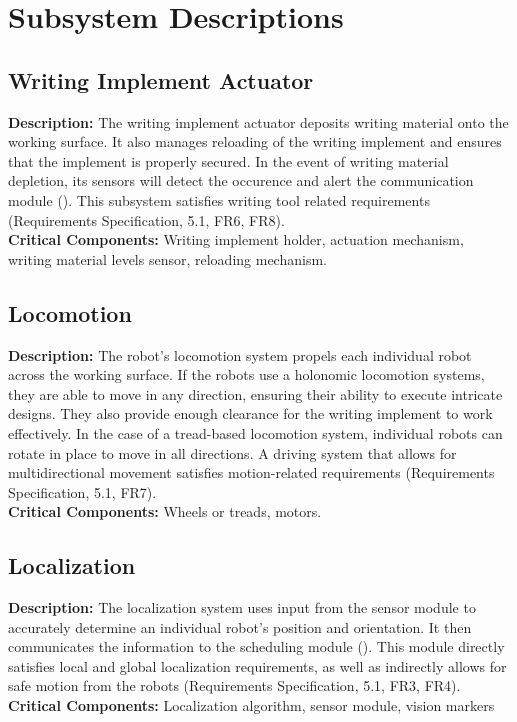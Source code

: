 
\section{Subsystem Descriptions}
\label{sec:subsystem_descriptions}

\subsection{Writing Implement Actuator}
\label{sec:subsystem_writing_implement_actuator}
\textbf{Description:} The writing implement actuator deposits writing material onto the working surface. It also manages reloading of the writing implement and ensures that the implement is properly secured. In the event of writing material depletion, its sensors will detect the occurence and alert the communication module (). This subsystem satisfies writing tool related requirements (Requirements Specification, 5.1, FR6, FR8).\\
\textbf{Critical Components:} Writing implement holder, actuation mechanism, writing material levels sensor, reloading mechanism.\\

\subsection{Locomotion}
\label{sec:subsystem_locomotion}
\textbf{Description:} The robot's locomotion system propels each individual robot across the working surface. If the robots use a holonomic locomotion systems, they are able to move in any direction, ensuring their ability to execute intricate designs. They also provide enough clearance for the writing implement to work effectively. In the case of a tread-based locomotion system, individual robots can rotate in place to move in all directions. A driving system that allows for multidirectional movement satisfies motion-related requirements (Requirements Specification, 5.1, FR7).\\
\textbf{Critical Components:} Wheels or treads, motors.\\

\subsection{Localization}
\label{sec:subsystem_localization}
\textbf{Description:} The localization system uses input from the sensor module to accurately determine an individual robot's position and orientation. It then communicates the information to the scheduling module (). This module directly satisfies local and global localization requirements, as well as indirectly allows for safe motion from the robots (Requirements Specification, 5.1, FR3, FR4).
\textbf{Critical Components:} Localization algorithm, sensor module, vision markers


